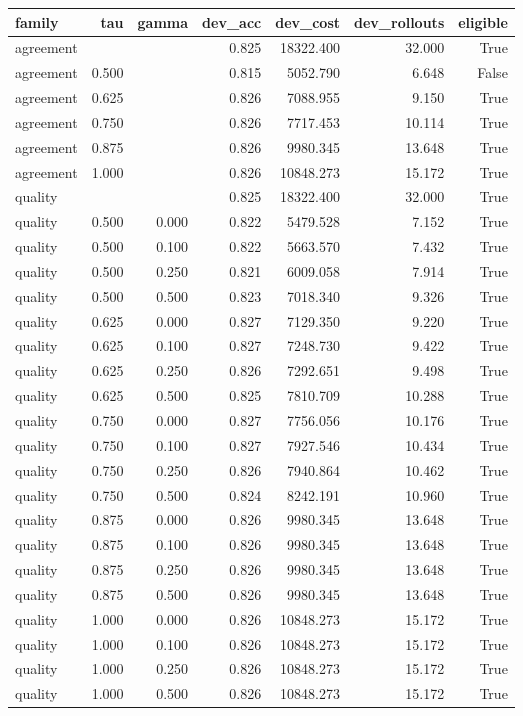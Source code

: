 \begin{tabular}{lrrrrrr}
\toprule
family & tau & gamma & dev\_acc & dev\_cost & dev\_rollouts & eligible \\
\midrule
agreement &  &  & 0.825 & 18322.400 & 32.000 & True \\
agreement & 0.500 &  & 0.815 & 5052.790 & 6.648 & False \\
agreement & 0.625 &  & 0.826 & 7088.955 & 9.150 & True \\
agreement & 0.750 &  & 0.826 & 7717.453 & 10.114 & True \\
agreement & 0.875 &  & 0.826 & 9980.345 & 13.648 & True \\
agreement & 1.000 &  & 0.826 & 10848.273 & 15.172 & True \\
quality &  &  & 0.825 & 18322.400 & 32.000 & True \\
quality & 0.500 & 0.000 & 0.822 & 5479.528 & 7.152 & True \\
quality & 0.500 & 0.100 & 0.822 & 5663.570 & 7.432 & True \\
quality & 0.500 & 0.250 & 0.821 & 6009.058 & 7.914 & True \\
quality & 0.500 & 0.500 & 0.823 & 7018.340 & 9.326 & True \\
quality & 0.625 & 0.000 & 0.827 & 7129.350 & 9.220 & True \\
quality & 0.625 & 0.100 & 0.827 & 7248.730 & 9.422 & True \\
quality & 0.625 & 0.250 & 0.826 & 7292.651 & 9.498 & True \\
quality & 0.625 & 0.500 & 0.825 & 7810.709 & 10.288 & True \\
quality & 0.750 & 0.000 & 0.827 & 7756.056 & 10.176 & True \\
quality & 0.750 & 0.100 & 0.827 & 7927.546 & 10.434 & True \\
quality & 0.750 & 0.250 & 0.826 & 7940.864 & 10.462 & True \\
quality & 0.750 & 0.500 & 0.824 & 8242.191 & 10.960 & True \\
quality & 0.875 & 0.000 & 0.826 & 9980.345 & 13.648 & True \\
quality & 0.875 & 0.100 & 0.826 & 9980.345 & 13.648 & True \\
quality & 0.875 & 0.250 & 0.826 & 9980.345 & 13.648 & True \\
quality & 0.875 & 0.500 & 0.826 & 9980.345 & 13.648 & True \\
quality & 1.000 & 0.000 & 0.826 & 10848.273 & 15.172 & True \\
quality & 1.000 & 0.100 & 0.826 & 10848.273 & 15.172 & True \\
quality & 1.000 & 0.250 & 0.826 & 10848.273 & 15.172 & True \\
quality & 1.000 & 0.500 & 0.826 & 10848.273 & 15.172 & True \\
\bottomrule
\end{tabular}
